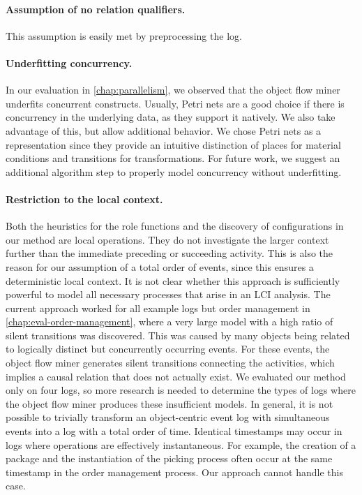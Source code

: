 \paragraph{Assumption of no relation qualifiers.}
This assumption is easily met by preprocessing the log.



\paragraph{Underfitting concurrency.}
In our evaluation in \cref{chap:parallelism}, we observed that the object flow miner underfits concurrent constructs.
Usually, Petri nets are a good choice if there is concurrency in the underlying data, as they support it natively.
We also take advantage of this, but allow additional behavior.
We chose Petri nets as a representation since they provide an intuitive distinction of places for material conditions and transitions for transformations.
For future work, we suggest an additional algorithm step to properly model concurrency without underfitting.



\paragraph{Restriction to the local context.}
Both the heuristics for the role functions and the discovery of configurations in our method are local operations.
They do not investigate the larger context further than the immediate preceding or succeeding activity.
This is also the reason for our assumption of a total order of events, since this ensures a deterministic local context.
It is not clear whether this approach is sufficiently powerful to model all necessary processes that arise in an LCI analysis.
The current approach worked for all example logs but order management in \cref{chap:eval-order-management}, where a very large model with a high ratio of silent transitions was discovered.
This was caused by many objects being related to logically distinct but concurrently occurring events.
For these events, the object flow miner generates silent transitions connecting the activities, which implies a causal relation that does not actually exist.
We evaluated our method only on four logs, so more research is needed to determine the types of logs where the object flow miner produces these insufficient models.
In general, it is not possible to trivially transform an object-centric event log with simultaneous events into a log with a total order of time.
Identical timestamps may occur in logs where operations are effectively instantaneous.
For example, the creation of a package and the instantiation of the picking process often occur at the same timestamp in the order management process.
Our approach cannot handle this case.




